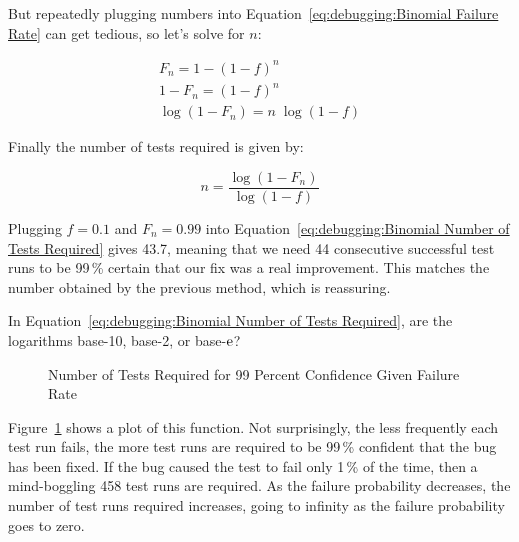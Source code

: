 But repeatedly plugging numbers into
Equation~\ref{eq:debugging:Binomial Failure Rate}
can get tedious, so let's solve for $n$:

\begin{eqnarray}
	F_n = 1-\left(1-f\right)^n \\
	1 - F_n = \left(1-f\right)^n \\
	\log \left(1 - F_n\right) = n \; \log \left(1 - f\right)
\end{eqnarray}

Finally the number of tests required is given by:

\begin{equation}
	n = \frac{\log\left(1 - F_n\right)}{\log\left(1 - f\right)}
\label{eq:debugging:Binomial Number of Tests Required}
\end{equation}

Plugging $f=0.1$ and $F_n=0.99$ into
Equation~\ref{eq:debugging:Binomial Number of Tests Required}
gives 43.7, meaning that we need 44 consecutive successful test
runs to be 99\,\% certain that our fix was a real improvement.
This matches the number obtained by the previous method, which
is reassuring.

\QuickQuiz{}
	In Equation~\ref{eq:debugging:Binomial Number of Tests Required},
	are the logarithms base-10, base-2, or base-$\mathrm{e}$?
 \QuickQuizEnd

\begin{figure}[tb]
\centering
{}
\caption{Number of Tests Required for 99 Percent Confidence Given Failure Rate}
\label{fig:debugging:Number of Tests Required for 99 Percent Confidence Given Failure Rate}
\end{figure}

Figure~\ref{fig:debugging:Number of Tests Required for 99 Percent Confidence Given Failure Rate}
shows a plot of this function.
Not surprisingly, the less frequently each test run fails, the more
test runs are required to be 99\,\% confident that the bug has been
fixed.
If the bug caused the test to fail only 1\,\% of the time, then a
mind-boggling 458 test runs are required.
As the failure probability decreases, the number of test runs required
increases, going to infinity as the failure probability goes to zero.


